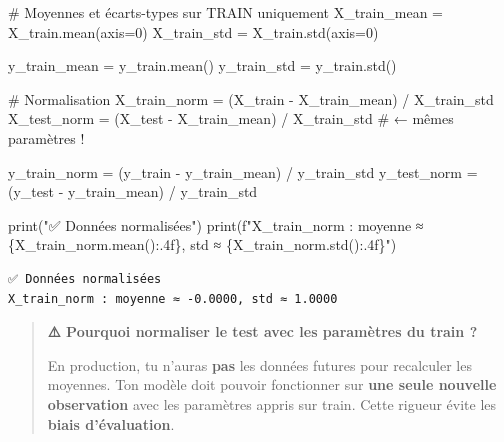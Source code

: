 \documentclass[
  french,
  11pt,
  a4paper,
]{scrbook}
\newenvironment{Shaded}{}{}
\newcommand{\BuiltInTok}[1]{\textcolor[rgb]{0.84,0.23,0.29}{#1}}
\newcommand{\CommentTok}[1]{\textcolor[rgb]{0.42,0.45,0.49}{#1}}
\newcommand{\DecValTok}[1]{\textcolor[rgb]{0.00,0.36,0.77}{#1}}
\newcommand{\NormalTok}[1]{\textcolor[rgb]{0.14,0.16,0.18}{#1}}
\newcommand{\OperatorTok}[1]{\textcolor[rgb]{0.14,0.16,0.18}{#1}}
\newcommand{\SpecialCharTok}[1]{\textcolor[rgb]{0.00,0.36,0.77}{#1}}
\newcommand{\SpecialStringTok}[1]{\textcolor[rgb]{0.01,0.18,0.38}{#1}}
\newcommand{\StringTok}[1]{\textcolor[rgb]{0.01,0.18,0.38}{#1}}
\begin{document}
\begin{tcolorbox}[enhanced jigsaw, arc=.35mm, bottomrule=.15mm, bottomtitle=1mm, breakable, colback=white, colbacktitle=quarto-callout-tip-color!10!white, colframe=quarto-callout-tip-color-frame, coltitle=black, left=2mm, leftrule=.75mm, opacityback=0, opacitybacktitle=0.6, rightrule=.15mm, title=\textcolor{quarto-callout-tip-color}{\faLightbulb}\hspace{0.5em}{✅ Corrigé Étape 3.3}, titlerule=0mm, toprule=.15mm, toptitle=1mm]

\begin{Shaded}
\begin{Highlighting}[]
\CommentTok{\# Moyennes et écarts{-}types sur TRAIN uniquement}
\NormalTok{X\_train\_mean }\OperatorTok{=}\NormalTok{ X\_train.mean(axis}\OperatorTok{=}\DecValTok{0}\NormalTok{)}
\NormalTok{X\_train\_std }\OperatorTok{=}\NormalTok{ X\_train.std(axis}\OperatorTok{=}\DecValTok{0}\NormalTok{)}

\NormalTok{y\_train\_mean }\OperatorTok{=}\NormalTok{ y\_train.mean()}
\NormalTok{y\_train\_std }\OperatorTok{=}\NormalTok{ y\_train.std()}

\CommentTok{\# Normalisation}
\NormalTok{X\_train\_norm }\OperatorTok{=}\NormalTok{ (X\_train }\OperatorTok{{-}}\NormalTok{ X\_train\_mean) }\OperatorTok{/}\NormalTok{ X\_train\_std}
\NormalTok{X\_test\_norm }\OperatorTok{=}\NormalTok{ (X\_test }\OperatorTok{{-}}\NormalTok{ X\_train\_mean) }\OperatorTok{/}\NormalTok{ X\_train\_std  }\CommentTok{\# ← mêmes paramètres !}

\NormalTok{y\_train\_norm }\OperatorTok{=}\NormalTok{ (y\_train }\OperatorTok{{-}}\NormalTok{ y\_train\_mean) }\OperatorTok{/}\NormalTok{ y\_train\_std}
\NormalTok{y\_test\_norm }\OperatorTok{=}\NormalTok{ (y\_test }\OperatorTok{{-}}\NormalTok{ y\_train\_mean) }\OperatorTok{/}\NormalTok{ y\_train\_std}

\BuiltInTok{print}\NormalTok{(}\StringTok{"✅ Données normalisées"}\NormalTok{)}
\BuiltInTok{print}\NormalTok{(}\SpecialStringTok{f"X\_train\_norm : moyenne ≈ }\SpecialCharTok{\{}\NormalTok{X\_train\_norm}\SpecialCharTok{.}\NormalTok{mean()}\SpecialCharTok{:.4f\}}\SpecialStringTok{, std ≈ }\SpecialCharTok{\{}\NormalTok{X\_train\_norm}\SpecialCharTok{.}\NormalTok{std()}\SpecialCharTok{:.4f\}}\SpecialStringTok{"}\NormalTok{)}
\end{Highlighting}
\end{Shaded}

\begin{verbatim}
✅ Données normalisées
X_train_norm : moyenne ≈ -0.0000, std ≈ 1.0000
\end{verbatim}

\begin{quote}
\textbf{⚠️ Pourquoi normaliser le test avec les paramètres du train ?}

En production, tu n'auras \textbf{pas} les données futures pour
recalculer les moyennes. Ton modèle doit pouvoir fonctionner sur
\textbf{une seule nouvelle observation} avec les paramètres appris sur
train. Cette rigueur évite les \textbf{biais d'évaluation}.
\end{quote}

\end{tcolorbox}
\end{document}

